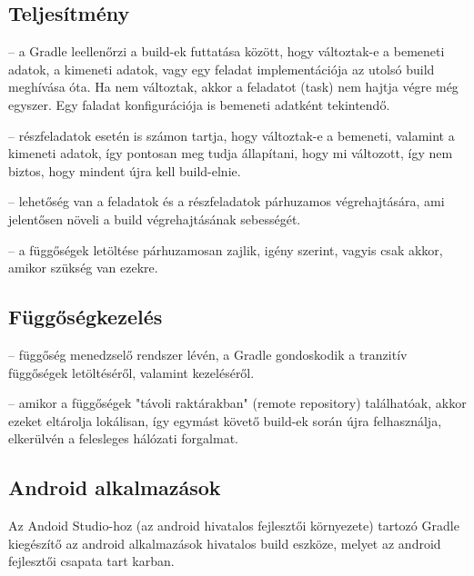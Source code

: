 \subsection{Teljesítmény}

\begin{description}
	\setlength{\itemsep}{0.04mm}
	\item[Inkrementális build] -- a Gradle leellenőrzi a build-ek futtatása között, hogy változtak-e a bemeneti adatok, a kimeneti adatok, vagy egy feladat implementációja az utolsó build meghívása óta. Ha nem változtak, akkor a feladatot (task) nem hajtja végre még egyszer. Egy faladat konfigurációja is bemeneti adatként tekintendő.
	\item[Inkrementális részfeladatok] -- részfeladatok esetén is számon tartja, hogy változtak-e a bemeneti, valamint a kimeneti adatok, így pontosan meg tudja állapítani, hogy mi változott, így nem biztos, hogy mindent újra kell build-elnie.
	\item[Párhuzamos végrehajtás] -- lehetőség van a feladatok és a részfeladatok párhuzamos végrehajtására, ami jelentősen növeli a build végrehajtásának sebességét.
	\item[Függőségek párhuzamos letöltése] -- a függőségek letöltése párhuzamosan zajlik, igény szerint, vagyis csak akkor, amikor szükség van ezekre.
\end{description}

\subsection{Függőségkezelés}

\begin{description}
	\setlength{\itemsep}{0.04mm}
	\item[Tranzitív függőségek] -- függőség menedzselő rendszer lévén, a Gradle gondoskodik a tranzitív függőségek letöltéséről, valamint kezeléséről.
	\item[Külső függőségek] -- amikor a függőségek "távoli raktárakban" (remote repository) találhatóak, akkor ezeket eltárolja lokálisan, így egymást követő build-ek során újra felhasználja, elkerülvén a felesleges hálózati forgalmat.
\end{description}

\subsection{Android alkalmazások}

Az Andoid Studio-hoz (az android hivatalos fejlesztői környezete) tartozó Gradle kiegészítő az android alkalmazások hivatalos build eszköze, melyet az android fejlesztői csapata tart karban.

